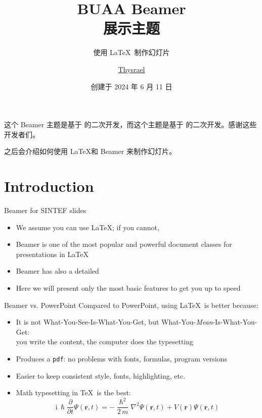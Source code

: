 \documentclass{ctexbeamer}
\title{BUAA Beamer \\ 展示主题}
\subtitle{使用 \LaTeX\ 制作幻灯片}
\author{\href{https://github.com/Thysrael}{Thysrael}}
\date{创建于 2024 年 6 月 11 日}
\begin{document}
\maketitle

\begin{frame}
  这个 Beamer 主题是基于  的二次开发，而这个主题是基于  的二次开发。感谢这些开发者们。
  
  之后会介绍如何使用 \LaTeX 和 Beamer 来制作幻灯片。

  
\end{frame}

\section{Introduction}

\begin{frame}{Beamer for SINTEF slides}{\thesection \, \secname}

  \begin{itemize}
  \item We assume you can use \LaTeX; if you cannot,
  \item Beamer is one of the most popular and powerful document
    classes for presentations in \LaTeX
  \item Beamer has also a detailed
  \item Here we will present only the most basic features to get you up to speed
  \end{itemize}
\end{frame}

\begin{frame}{Beamer vs. PowerPoint}
  Compared to PowerPoint, using \LaTeX\ is better because:
  \begin{itemize}
  \item It is not What-You-See-Is-What-You-Get, but
    What-You-\emph{Mean}-Is-What-You-Get:\\
    you write the content, the computer does the typesetting
  \item Produces a \texttt{pdf}: no problems with fonts, formulas,
    program versions
  \item Easier to keep consistent style, fonts, highlighting, etc.
  \item Math typesetting in \TeX\ is the best:
    \begin{equation*}
      \mathrm{i}\,\hslash\frac{\partial}{\partial t} \Psi(\mathbf{r},t) =
      -\frac{\hslash^2}{2\,m}\nabla^2\Psi(\mathbf{r},t)
      + V(\mathbf{r})\Psi(\mathbf{r},t)
    \end{equation*}

  \end{itemize}
\end{frame}
\end{document}
